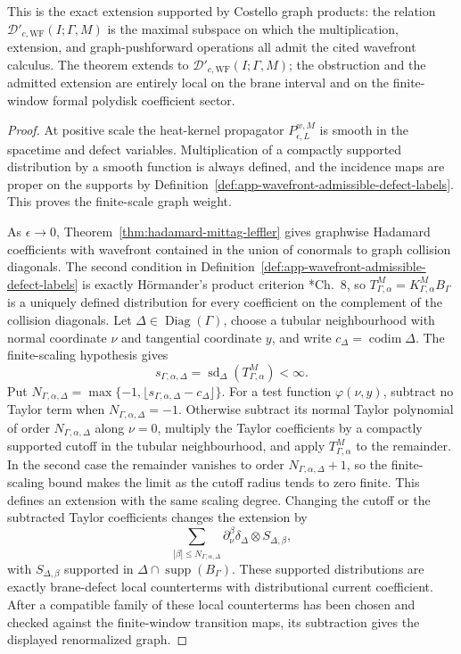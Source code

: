 \begin{prop}
  This is the exact extension supported by Costello graph products:
  the relation \(\mathcal D'_{c,\mathrm{WF}}(I;\Gamma,M)\) is the
  maximal subspace on which the multiplication, extension, and
  graph-pushforward operations all admit the cited wavefront calculus.
  The theorem extends to \(\mathcal D'_{c,\mathrm{WF}}(I;\Gamma,M)\);
  the obstruction and the admitted extension are entirely local on the
  brane interval and on the finite-window formal polydisk coefficient
  sector.
\end{prop}

\begin{proof}
  At positive scale the heat-kernel propagator
  \(P_{\epsilon,L}^{w,M}\) is smooth in the spacetime and defect
  variables.  Multiplication of a compactly supported distribution by a
  smooth function is always defined, and the incidence maps are proper on
  the supports by Definition~\ref{def:app-wavefront-admissible-defect-labels}.
  This proves the finite-scale graph weight.

  As \(\epsilon\to0\), Theorem~\ref{thm:hadamard-mittag-leffler} gives
  graphwise Hadamard coefficients with wavefront contained in the union of
  conormals to graph collision diagonals.  The second condition in
  Definition~\ref{def:app-wavefront-admissible-defect-labels} is exactly
  H\"ormander's product criterion
  \cite{hormander-vol1}*{Ch.~8}, so
  \(T_{\Gamma,\alpha}^M=K^M_{\Gamma,\alpha}B_\Gamma\) is a uniquely
  defined distribution for every coefficient on the complement of the
  collision diagonals.  Let
  \(\Delta\in\operatorname{Diag}(\Gamma)\), choose a tubular
  neighbourhood with normal coordinate \(\nu\) and tangential coordinate
  \(y\), and write \(c_\Delta=\operatorname{codim}\Delta\).  The
  finite-scaling hypothesis gives
  \[
    s_{\Gamma,\alpha,\Delta}
      =\operatorname{sd}_\Delta(T_{\Gamma,\alpha}^M)<\infty .
  \]
  Put
  \(N_{\Gamma,\alpha,\Delta}=
  \max\{-1,\lfloor s_{\Gamma,\alpha,\Delta}-c_\Delta\rfloor\}\).  For
  a test function \(\varphi(\nu,y)\), subtract no Taylor term when
  \(N_{\Gamma,\alpha,\Delta}=-1\).  Otherwise subtract its normal Taylor
  polynomial of order \(N_{\Gamma,\alpha,\Delta}\) along \(\nu=0\),
  multiply the Taylor coefficients by a compactly supported cutoff in the
  tubular neighbourhood, and apply \(T_{\Gamma,\alpha}^M\) to the
  remainder.  In the second case the remainder vanishes to order
  \(N_{\Gamma,\alpha,\Delta}+1\), so the finite-scaling bound makes the
  limit as the cutoff radius tends to zero finite.  This defines an
  extension with the same scaling degree.  Changing the cutoff or the
  subtracted Taylor coefficients changes the extension by
  \[
    \sum_{|\beta|\leq N_{\Gamma,\alpha,\Delta}}
      \partial_\nu^\beta\delta_\Delta\otimes S_{\Delta,\beta},
  \]
  with \(S_{\Delta,\beta}\) supported in
  \(\Delta\cap\operatorname{supp}(B_\Gamma)\).  These supported
  distributions are exactly brane-defect local counterterms with
  distributional current coefficient.  After a compatible family of
  these local counterterms has been chosen and checked against the
  finite-window transition maps, its subtraction gives the displayed
  renormalized graph.


\end{proof}
